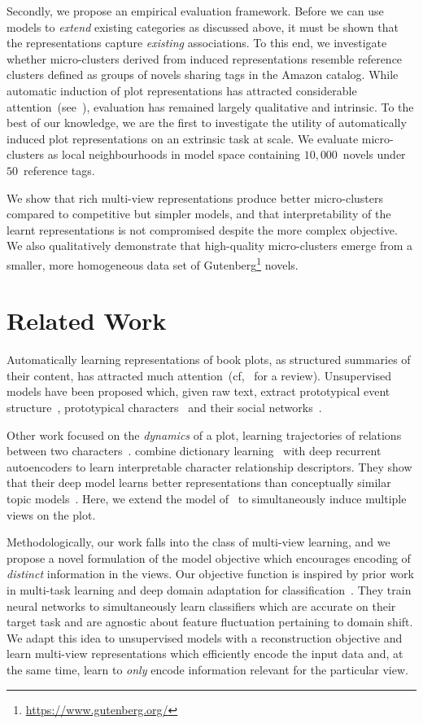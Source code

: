 \documentclass[11pt,letterpaper]{article}
\begin{document}
Secondly, we propose an empirical evaluation framework. Before we can use models to {\it extend} existing categories as discussed above, it must be shown that the representations capture {\it existing} associations. To this end, we investigate whether micro-clusters derived from induced representations resemble reference clusters defined as groups of novels sharing tags in the Amazon catalog. While automatic induction of plot representations has attracted considerable attention~(see~), evaluation has remained largely qualitative and intrinsic. To the best of our knowledge, we are the first to investigate the utility of automatically induced plot representations on an extrinsic task at scale. We evaluate micro-clusters as local neighbourhoods in model space containing $10,000$~novels under $50$~reference tags.

We show that rich multi-view representations produce better micro-clusters compared to competitive but simpler models, and that interpretability of the learnt representations is not compromised despite the more complex objective. We also qualitatively demonstrate that high-quality micro-clusters emerge from a smaller, more homogeneous data set of Gutenberg\footnote{\url{https://www.gutenberg.org/}} novels.

\section{Related Work}
Automatically learning representations of book plots, as structured summaries of their content, has attracted much attention~(cf,~ for a review). Unsupervised models have been proposed which, given raw text, extract prototypical event structure~\cite{Mcintyre:2010,Chambers:2009}, prototypical characters~\cite{Bamman:2013,Bamman:2014,Elsner:2012} and their social networks~\cite{Elson:2010}. 

Other work focused on the {\it dynamics} of a plot, learning trajectories of relations between two characters~\cite{Iyyer:2016,Chaturvedi:2017}.  combine dictionary learning~\citep{Olshausen:1997} with deep recurrent autoencoders to learn interpretable character relationship descriptors.
They show that their deep model learns better representations than conceptually similar topic models~\cite{Gruber:2007,Chang:2009}. Here, we extend the model of~ to simultaneously induce multiple views on the plot.

Methodologically, our work falls into the class of multi-view learning, and we propose a novel formulation of the model objective which encourages encoding of {\it distinct} information in the views.
Our objective function is inspired by prior work in multi-task learning and deep domain adaptation for classification~\cite{Ganin:2015,Ganin:2016}. They train neural networks to simultaneously learn classifiers which are accurate on their target task and are agnostic about feature fluctuation pertaining to domain shift. We adapt this idea to unsupervised models with a reconstruction objective and learn multi-view representations which efficiently encode the input data and, at the same time, learn to {\it only} encode information relevant for the particular view.
\end{document}
